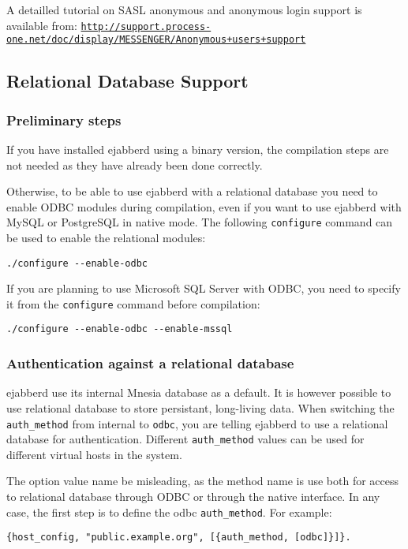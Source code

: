 \documentclass[a4paper,10pt]{article}
\newcommand{\term}[1]{\texttt{#1}}
\gdef\ahrefurl#1{\href{#1}{\texttt{#1}}}
\begin{document}
A detailled tutorial on SASL anonymous and anonymous login support is
available from:
\ahrefurl{http://support.process-one.net/doc/display/MESSENGER/Anonymous+users+support}

\subsection{Relational Database Support}
\label{sec:relationaldatabase}

\subsubsection{Preliminary steps}
\label{sec:relationaldatabasecompilation}

If you have installed ejabberd using a binary version, the compilation steps
are not needed as they have already been done correctly.

Otherwise, to be able to use ejabberd with a relational database you need to
enable ODBC modules during compilation, even if you want to use ejabberd with
MySQL or PostgreSQL in native mode. The following \term{configure} command can
be used to enable the relational modules:
\begin{verbatim}
./configure --enable-odbc
\end{verbatim}

If you are planning to use Microsoft SQL Server with ODBC, you need to specify
it from the \term{configure} command before compilation:
\begin{verbatim}
./configure --enable-odbc --enable-mssql
\end{verbatim}

\subsubsection{Authentication against a relational database}
\label{sec:relationaldatabaseauth}

ejabberd use its internal Mnesia database as a default. It is however possible
to use relational database to store persistant, long-living data. When
switching the \term{auth\_method} from internal to \term{odbc}, you are
telling ejabberd to use a relational database for authentication. Different
\term{auth\_method} values can be used for different virtual hosts in the
system.

The option value name be misleading, as the method name is use both for access
to relational database through ODBC or through the native interface. In any
case, the first step is to define the odbc \term{auth\_method}. For example:
\begin{verbatim}
{host_config, "public.example.org", [{auth_method, [odbc]}]}.
\end{verbatim}
\end{document}
